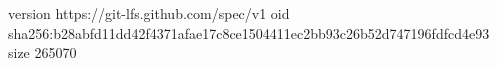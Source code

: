 version https://git-lfs.github.com/spec/v1
oid sha256:b28abfd11dd42f4371afae17c8ce1504411ec2bb93c26b52d747196fdfcd4e93
size 265070
